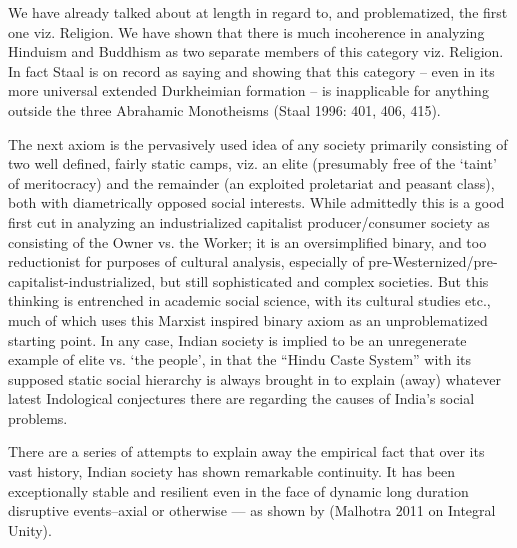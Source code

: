 We have already talked about at length in regard to, and problematized, the first one viz. Religion. We have shown that there is much incoherence in analyzing Hinduism and Buddhism as two separate members of this category viz. Religion. In fact Staal is on record as saying and showing that this category – even in its more universal extended Durkheimian formation – is inapplicable for anything outside the three Abrahamic Monotheisms (Staal 1996: 401, 406, 415).

The next axiom is the pervasively used idea of any society primarily consisting of two well defined, fairly static camps, viz. an elite (presumably free of the ‘taint’ of meritocracy) and the remainder (an exploited proletariat and peasant class), both with diametrically opposed social interests. While admittedly this is a good first cut in analyzing an industrialized capitalist producer/consumer society as consisting of the Owner vs. the Worker; it is an oversimplified binary, and too reductionist for purposes of cultural analysis, especially of pre-Westernized/pre-capitalist-industrialized, but still sophisticated and complex societies. But this thinking is entrenched in academic social science, with its cultural studies etc., much of which uses this Marxist inspired binary axiom as an unproblematized starting point. In any case, Indian society is implied to be an unregenerate example of elite vs. ‘the people’, in that the “Hindu Caste System” with its supposed static social hierarchy is always brought in to explain (away) whatever latest Indological conjectures there are regarding the causes of India’s social problems.

There are a series of attempts to explain away the empirical fact that over its vast history, Indian society has shown remarkable continuity. It has been exceptionally stable and resilient even in the face of dynamic long duration disruptive events--axial or otherwise --- as shown by (Malhotra 2011 on Integral Unity).

